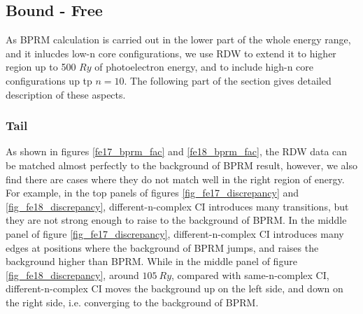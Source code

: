 \subsection{Bound - Free} \label{section_bf}
As BPRM calculation is carried out in the lower part of the whole energy range, and it inlucdes low-n core configurations, we use RDW to extend it to higher region up to 500 $Ry$ of photoelectron energy, and to include high-n core configurations up tp $n=10$. The following part of the section gives detailed description of these aspects.

\subsubsection{Tail} \label{section_tail}
As shown in figures \ref{fe17_bprm_fac} and \ref{fe18_bprm_fac}, the RDW data can be matched almost perfectly to the background of BPRM result, however, we also find there are cases where they do not match well in the right region of energy. For example, in the top panels of figures \ref{fig_fe17_discrepancy} and \ref{fig_fe18_discrepancy}, different-n-complex CI introduces many transitions, but they are not strong enough to raise to the  background of BPRM. In the middle panel of figure \ref{fig_fe17_discrepancy}, different-n-complex CI introduces many edges at positions where the background of BPRM jumps, and raises the background higher than BPRM. While in the middle panel of figure \ref{fig_fe18_discrepancy}, around $105~Ry$, compared with same-n-complex CI, different-n-complex CI moves the background up on the left side, and down on the right side, i.e. converging to the background of BPRM.

